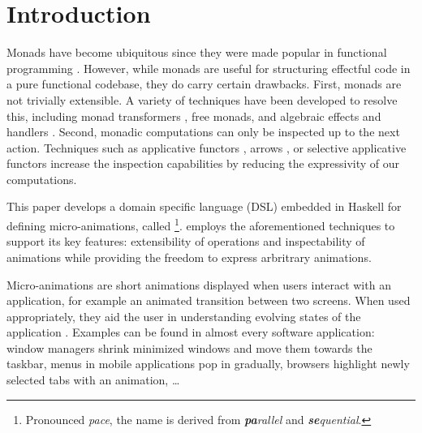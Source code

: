 \section{Introduction}
\label{sec:intro}

Monads have become ubiquitous since they were made popular in functional programming \cite{DBLP:conf/lfp/Wadler90}. However, while monads are useful for structuring effectful code in a pure functional codebase, they do carry certain drawbacks. First, monads are not trivially extensible. A variety of techniques have been developed to resolve this, including monad transformers \cite{DBLP:conf/popl/LiangHJ95}, free monads, and algebraic effects and handlers \cite{DBLP:conf/esop/PlotkinP09}. Second, monadic computations can only be inspected up to the next action. Techniques such as applicative functors \cite{DBLP:journals/jfp/McbrideP08}, arrows \cite{DBLP:journals/scp/Hughes00}, or selective applicative functors \cite{Mokhov:2019:SAF:3352468.3341694} increase the inspection capabilities by reducing the expressivity of our computations.

This paper develops a domain specific language (DSL) embedded in Haskell for defining micro-animations, called \dsl{}\footnote{Pronounced \textit{pace}, the name is derived from \textit{\textbf{pa}rallel} and \textit{\textbf{se}quential}.}. \dsl{} employs the aforementioned techniques to support its key features: extensibility of operations and inspectability of animations while providing the freedom to express arbritrary animations.

Micro-animations are short animations displayed when users interact with an application, for example an animated transition between two screens. When used appropriately, they aid the user in understanding evolving states of the application \cite{DBLP:conf/infovis/BedersonB99} \cite{DBLP:conf/chi/Gonzalez96} \cite{DBLP:journals/tvcg/HeerR07}. Examples can be found in almost every software application: window managers shrink minimized windows and move them towards the taskbar, menus in mobile applications pop in gradually, browsers highlight newly selected tabs with an animation, \ldots

